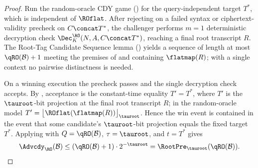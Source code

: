 \begin{proof}
Run the random-oracle CDY game () for the
query-independent target $T^*$, which is independent of $\ROflat$. After
rejecting on a failed syntax or ciphertext-validity precheck on
$C \concat T^*$, the challenger performs $m = 1$ deterministic decryption
check $\Dec_{K}^\RO(N,A,C \concat T^*)$, reaching a final root transcript
$R$. The Root-Tag Candidate Sequence lemma
() yields a sequence of length at most
$\qRO(\mathcal{B}) + 1$ meeting the premises of
 and containing $\flatmap(R)$; with
a single context no pairwise distinctness is needed.

On a winning execution the precheck passes and the single decryption
check accepts. By , acceptance is the constant-time
equality $T' = T^*$, where $T'$ is the $\tauroot$-bit projection at the
final root transcript $R$; in the random-oracle model
$T' = \bigl\lfloor \ROflat(\flatmap(R)) \bigr\rfloor_{\tauroot}$. Hence
the win event is contained in the event that some candidate's
$\tauroot$-bit projection equals the fixed target $T^*$. Applying
 with $Q = \qRO(\mathcal{B})$,
$\tau = \tauroot$, and $t = T^*$ gives
\[
  \Advcdy_\RO(\mathcal{B})
  \leq
  (\qRO(\mathcal{B}) + 1) \cdot 2^{-\tauroot}
  =
  \RootPre_{\tauroot}(\qRO(\mathcal{B})).
\]
\end{proof}
